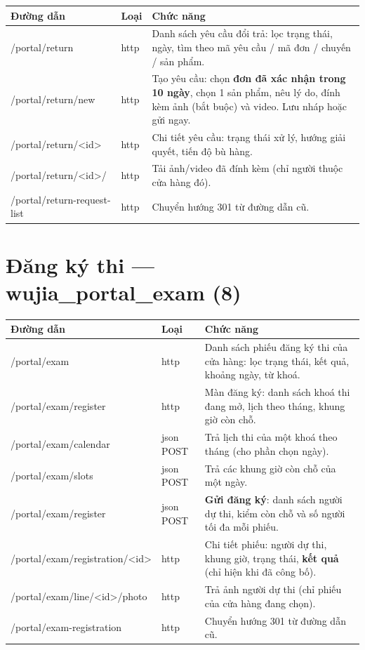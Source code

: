 \documentclass[11pt,a4paper]{report}
\newcommand{\rt}[1]{{\ttfamily\footnotesize #1}}
\begin{document}
{\small
\begin{longtable}{@{}L{5.4cm}L{1.5cm}L{7.5cm}@{}}
\toprule
\textbf{Đường dẫn} & \textbf{Loại} & \textbf{Chức năng} \\
\midrule
\endhead
\rt{/portal/return} & http & Danh sách yêu cầu đổi trả: lọc trạng thái, ngày, tìm theo mã yêu cầu / mã đơn / chuyến / sản phẩm. \\
\rt{/portal/return/new} & http & Tạo yêu cầu: chọn \textbf{đơn đã xác nhận trong 10 ngày}, chọn 1 sản phẩm, nêu lý do, đính kèm ảnh (bắt buộc) và video. Lưu nháp hoặc gửi ngay. \\
\rt{/portal/return/<id>} & http & Chi tiết yêu cầu: trạng thái xử lý, hướng giải quyết, tiến độ bù hàng. \\
\rt{/portal/return/<id>/}\allowbreak\rt{attachment/<id>} & http & Tải ảnh/video đã đính kèm (chỉ người thuộc cửa hàng đó). \\
\rt{/portal/return-request-list} & http & Chuyển hướng 301 từ đường dẫn cũ. \\
\bottomrule
\end{longtable}}

\section{Đăng ký thi --- \rt{wujia\_portal\_exam} (8)}

{\small
\begin{longtable}{@{}L{5.4cm}L{1.5cm}L{7.5cm}@{}}
\toprule
\textbf{Đường dẫn} & \textbf{Loại} & \textbf{Chức năng} \\
\midrule
\endhead
\rt{/portal/exam} & http & Danh sách phiếu đăng ký thi của cửa hàng: lọc trạng thái, kết quả, khoảng ngày, từ khoá. \\
\rt{/portal/exam/register} & http & Màn đăng ký: danh sách khoá thi đang mở, lịch theo tháng, khung giờ còn chỗ. \\
\rt{/portal/exam/calendar} & json POST & Trả lịch thi của một khoá theo tháng (cho phần chọn ngày). \\
\rt{/portal/exam/slots} & json POST & Trả các khung giờ còn chỗ của một ngày. \\
\rt{/portal/exam/register} & json POST & \textbf{Gửi đăng ký}: danh sách người dự thi, kiểm còn chỗ và số người tối đa mỗi phiếu. \\
\rt{/portal/exam/registration/<id>} & http & Chi tiết phiếu: người dự thi, khung giờ, trạng thái, \textbf{kết quả} (chỉ hiện khi đã công bố). \\
\rt{/portal/exam/line/<id>/photo} & http & Trả ảnh người dự thi (chỉ phiếu của cửa hàng đang chọn). \\
\rt{/portal/exam-registration} & http & Chuyển hướng 301 từ đường dẫn cũ. \\
\bottomrule
\end{longtable}}
\end{document}

